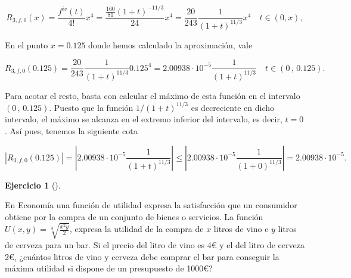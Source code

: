 \documentclass[
  a4paper,
]{scrreport}
\theoremstyle{definition}
\newtheorem{exercise}{Ejercicio}[chapter]
\theoremstyle{remark}
\begin{document}
\begin{tcolorbox}
\[
R_{3,f,0}(x) 
=\frac{f^{iv}(t)}{4!}x^4
=\frac{\frac{160}{81} (1+t)^{-11/3}}{24}x^4 
= \frac{20}{243}\frac{1}{(1+t)^{11/3}} x^4 \quad t\in(0,x),
\]

En el punto \(x=0.125\) donde hemos calculado la aproximación, vale

\[
R_{3,f,0}(0.125)
=\frac{20}{243}\frac{1}{(1+t)^{11/3}} 0.125^4
= 2.00938\cdot 10^{-5}\frac{1}{(1+t)^{11/3}} \quad t\in(0\,,\,0.125).
\]

Para acotar el resto, basta con calcular el máximo de esta función en el
intervalo \((0\,,\,0.125)\). Puesto que la función \(1/(1+t)^{11/3}\) es
decreciente en dicho intervalo, el máximo se alcanza en el extremo
inferior del intervalo, es decir, \(t=0\). Así pues, tenemos la
siguiente cota

\[
|R_{3,f,0}(0.125)|
= \left|2.00938\cdot 10^{-5}\frac{1}{(1+t)^{11/3}}\right|
\leq \left|2.00938\cdot 10^{-5}\frac{1}{(1+0)^{11/3}}\right|
=2.00938\cdot 10^{-5}.
\]

\end{tcolorbox}

\begin{exercise}[]\protect\hypertarget{exr-7}{}\label{exr-7}

En Economía una función de utilidad expresa la satisfacción que un
consumidor obtiene por la compra de un conjunto de bienes o servicios.
La función \(U(x,y)=\sqrt[3]{\frac{x^2y}{2}}\), expresa la utilidad de
la compra de \(x\) litros de vino e \(y\) litros de cerveza para un bar.
Si el precio del litro de vino es 4€ y el del litro de cerveza 2€,
¿cuántos litros de vino y cerveza debe comprar el bar para conseguir la
máxima utilidad si dispone de un presupuesto de 1000€?

\end{exercise}
\end{document}
